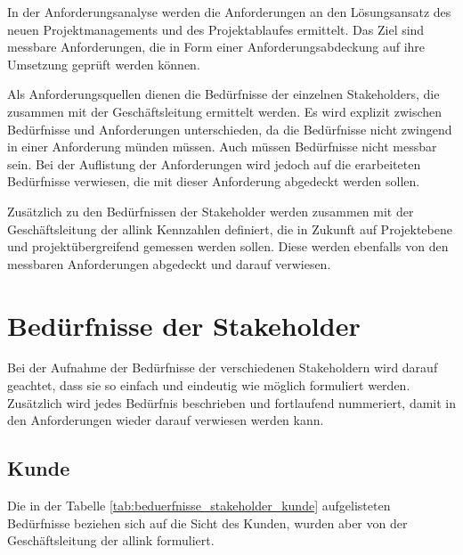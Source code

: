 In der Anforderungsanalyse werden die Anforderungen an den Lösungsansatz des
neuen Projektmanagements und des Projektablaufes ermittelt. Das Ziel sind messbare
Anforderungen, die in Form einer Anforderungsabdeckung auf ihre Umsetzung
geprüft werden können.

Als Anforderungsquellen dienen die Bedürfnisse der einzelnen Stakeholders, die 
zusammen mit der Geschäftsleitung ermittelt werden. Es wird explizit zwischen
Bedürfnisse und Anforderungen unterschieden, da die Bedürfnisse nicht zwingend
in einer Anforderung münden müssen. Auch müssen Bedürfnisse nicht messbar sein.
Bei der Auflistung der Anforderungen wird jedoch auf die erarbeiteten Bedürfnisse 
verwiesen, die mit dieser Anforderung abgedeckt werden sollen.

Zusätzlich zu den Bedürfnissen der Stakeholder werden zusammen mit der Geschäftsleitung
der allink Kennzahlen definiert, die in Zukunft auf Projektebene und projektübergreifend
gemessen werden sollen. Diese werden ebenfalls von den messbaren Anforderungen
abgedeckt und darauf verwiesen.

\section{Bedürfnisse der Stakeholder}

Bei der Aufnahme der Bedürfnisse der verschiedenen Stakeholdern wird darauf geachtet, dass sie so einfach und 
eindeutig wie möglich formuliert werden. Zusätzlich wird jedes Bedürfnis beschrieben
und fortlaufend nummeriert, damit in den Anforderungen wieder darauf verwiesen
werden kann.

\subsection{Kunde}
Die in der Tabelle \ref{tab:beduerfnisse_stakeholder_kunde} aufgelisteten 
Bedürfnisse beziehen sich auf die Sicht des Kunden, wurden aber von der
Geschäftsleitung der allink formuliert.

\clearpage

